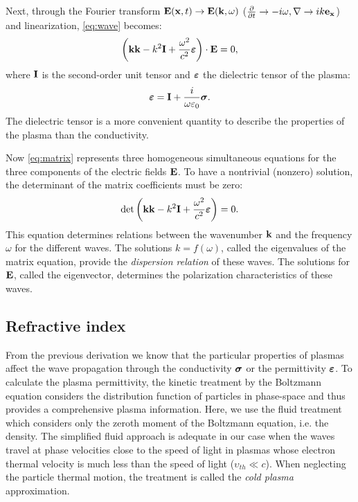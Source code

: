 Next, through the Fourier transform $\boldsymbol{\mathrm{E}}(\boldsymbol{\mathrm{x}},t) \rightarrow \boldsymbol{\mathrm{E}}(\boldsymbol{\mathrm{k}},\omega)$ ($\frac{\partial}{\partial{t}} \rightarrow -i\omega, \nabla \rightarrow ik\boldsymbol{\mathrm{e_x}}$) and linearization, \eqref{eq:wave} becomes:%
\begin{equation}\label{eq:matrix}
   \left( \boldsymbol{\mathrm{k}}\boldsymbol{\mathrm{k}} - k^2\boldsymbol{\mathrm{I}} + \frac{\omega^2}{c^2}\boldsymbol{\varepsilon} \right) \cdot \boldsymbol{\mathrm{E}} = 0,
\end{equation}
\noindent where $\boldsymbol{\mathrm{I}}$ is the second-order unit tensor and $\boldsymbol{\mathrm{\varepsilon}}$ the dielectric tensor of the plasma:%
\begin{equation}\label{eq:dielectric_definition}
  \boldsymbol{\mathrm{\varepsilon}} = \boldsymbol{\mathrm{I}} + \frac{i}{\omega\varepsilon_0}\boldsymbol{\mathrm{\sigma}}.
\end{equation}
\noindent The dielectric tensor is a more convenient quantity to describe the properties of the plasma than the conductivity.

Now \eqref{eq:matrix} represents three homogeneous simultaneous equations for the three components of the electric fields $\boldsymbol{\mathrm{E}}$. To have a nontrivial (nonzero) solution, the determinant of the matrix coefficients must be zero:%
\begin{equation}\label{eq:det_dispersion_relation}
   \mathrm{det}\left( \boldsymbol{\mathrm{k}}\boldsymbol{\mathrm{k}} - k^2\boldsymbol{\mathrm{I}} + \frac{\omega^2}{c^2}\boldsymbol{\varepsilon} \right)=0.
\end{equation}
\noindent This equation determines relations between the wavenumber $\boldsymbol{\mathrm{k}}$ and the frequency $\omega$ for the different waves. The solutions $k=f(\omega)$, called the eigenvalues of the matrix equation, provide the \emph{dispersion relation} of these waves. The solutions for $\boldsymbol{\mathrm{E}}$, called the eigenvector, determines the polarization characteristics of these waves.


\subsection{Refractive index} \label{sec:refractive_index}

From the previous derivation we know that the particular properties of plasmas affect the wave propagation through the conductivity $\boldsymbol{\mathrm{\sigma}}$ or the permittivity $\boldsymbol{\mathrm{\varepsilon}}$. To calculate the plasma permittivity, the kinetic treatment by the Boltzmann equation considers the distribution function of particles in phase-space and thus provides a comprehensive plasma information. Here, we use the fluid treatment which considers only the zeroth moment of the Boltzmann equation, i.e. the density. The simplified fluid approach is adequate in our case when the waves travel at phase velocities close to the speed of light in plasmas whose electron thermal velocity is much less than the speed of light ($\upsilon_{th} \ll c$). When neglecting the particle thermal motion, the treatment is called the \emph{cold plasma} approximation.

